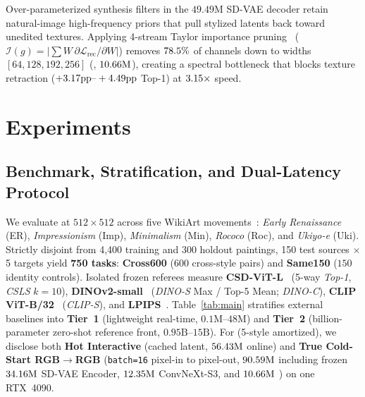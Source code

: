 \documentclass[conference]{IEEEtran}
\begin{document}
Over-parameterized synthesis filters in the $49.49\text{M}$ SD-VAE decoder retain natural-image high-frequency priors that pull stylized latents back toward unedited textures. Applying 4-stream Taylor importance pruning~\cite{molchanov2019importance} ($\mathcal{I}(g)=\lvert\sum W\,\partial\mathcal{L}_{\mathrm{rec}}/\partial W\rvert$) removes $78.5\%$ of channels down to widths $[64,128,192,256]$ (\textbf{\methoddec}, $10.66\text{M}$), creating a spectral bottleneck that blocks texture retraction ($+3.17\text{pp}\text{--}+4.49\text{pp}$ Top-1) at $3.15\times$ speed.

\section{Experiments}
\label{sec:experiments}

\subsection{Benchmark, Stratification, and Dual-Latency Protocol}

We evaluate at $512\times 512$ across five WikiArt movements~\cite{wright2022artfid}: \emph{Early Renaissance} (ER), \emph{Impressionism} (Imp), \emph{Minimalism} (Min), \emph{Rococo} (Roc), and \emph{Ukiyo-e} (Uki). Strictly disjoint from 4,400 training and 300 holdout paintings, 150 test sources $\times$ 5 targets yield \textbf{750 tasks}: \textbf{Cross600} ($600$ cross-style pairs) and \textbf{Same150} ($150$ identity controls). Isolated frozen referees measure \textbf{CSD-ViT-L}~\cite{somepalli2024csd} (5-way \emph{Top-1}, \emph{CSLS} $k=10$), \textbf{DINOv2-small}~\cite{oquab2023dinov2} (\emph{DINO-S} Max / Top-5 Mean; \emph{DINO-C}), \textbf{CLIP ViT-B/32}~\cite{radford2021clip} (\emph{CLIP-S}), and \textbf{LPIPS}~\cite{zhang2018unreasonable}. Table~\ref{tab:main} stratifies external baselines into \textbf{Tier~1} (lightweight real-time, $0.1\text{M}\text{--}48\text{M}$) and \textbf{Tier~2} (billion-parameter zero-shot reference front, $0.95\text{B}\text{--}15\text{B}$). For \textbf{\method} (5-style amortized), we disclose both \textbf{Hot Interactive} (cached latent, $56.43\text{M}$ online) and \textbf{True Cold-Start RGB$\to$RGB} (\texttt{batch=16} pixel-in to pixel-out, $90.59\text{M}$ including frozen $34.16\text{M}$ SD-VAE Encoder, $12.35\text{M}$ ConvNeXt-S3, and $10.66\text{M}$ \methoddec) on one RTX~4090.
\end{document}
